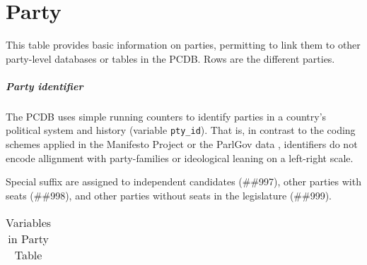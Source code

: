 \section{Party}\label{sec_party}
This table provides basic information on parties, permitting to link them to other party-level databases or tables in the PCDB. 
Rows are the different parties. 

\subparagraph{Party identifier}
The PCDB uses simple running counters to identify parties in a country's political system and history (variable \texttt{\footnotesize pty\_id}).
That is, in contrast to the coding schemes applied in the Manifesto Project \citep{ManifestoData2013} or the ParlGov data \citep{ParlGov2012}, identifiers do not encode allignment with party-families or ideological leaning on a left-right scale.

Special suffix are assigned to
independent candidates (\#\#997), 
other parties with seats (\#\#998), and 
other parties without seats in the legislature (\#\#999).
  


\begin{center}
\begin{longtable}{L{4cm} L{6cm} L{3cm}}
\caption{Variables in Party Table\label{tab_party}}


\end{longtable}
\end{center}
